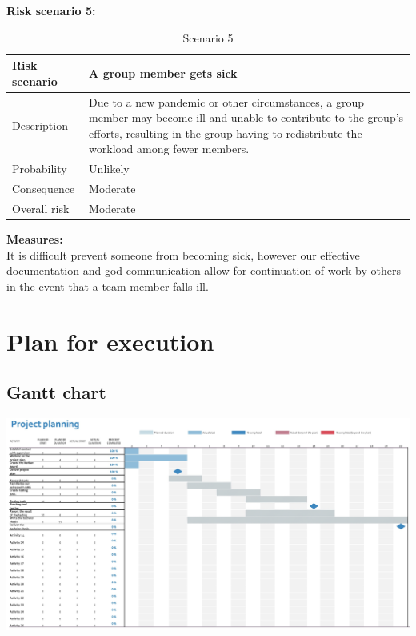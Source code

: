 \vspace{2cm}
\begin{table}[!ht]
    \raggedright
    \textbf{Risk scenario 5:}
    \\
    \centering
    \begin{tabular}{|p{}|p{}|}
    \hline
        Risk scenario & A group member gets sick \\ \hline
        Description & Due to a new pandemic or other circumstances, a group member may become ill and unable to contribute to the group's efforts, resulting in the group having to redistribute the workload among fewer members. \\ \hline
        Probability & Unlikely  \\ \hline
        Consequence & Moderate  \\ \hline
        Overall risk & \cellcolor{yellow!} Moderate \\ \hline
    \end{tabular}
    \caption{Scenario 5}
    \raggedright
    \textbf{Measures:}
    \\
    It is difficult prevent someone from becoming sick, however our effective documentation and god communication allow for continuation of work by others in the event that a team member falls ill.
\end{table}

\clearpage
\section{Plan for execution}
\subsection{Gantt chart}
\includegraphics[width=1\columnwidth]{Images/gantt2.jpg}
\\

